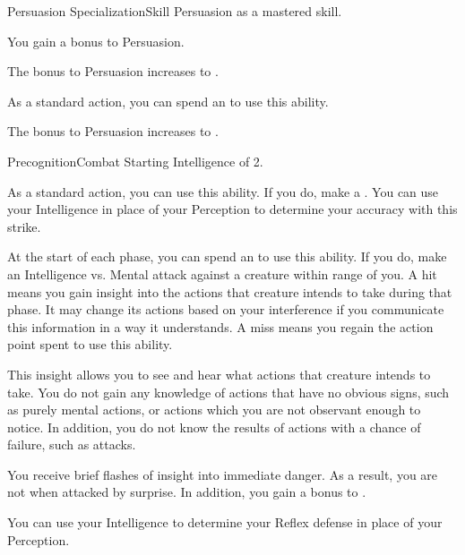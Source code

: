     \begin{feat}{Persuasion Specialization}{Skill}
        \featpre Persuasion as a mastered skill.
        \featben

         You gain a  bonus to Persuasion.

        \ff[2]{}

         The bonus to Persuasion increases to .

         As a standard action, you can spend an  to use this ability.

         The bonus to Persuasion increases to .
    \end{feat}

    \begin{feat}{Precognition}{Combat}
        \featpre Starting Intelligence of 2.
        \featben

         As a standard action, you can use this ability.
        If you do, make a .
        You can use your Intelligence in place of your Perception to determine your accuracy with this strike.

         At the start of each phase, you can spend an  to use this ability.
        If you do, make an Intelligence vs. Mental attack against a creature within \rngmed range of you.
        A hit means you gain insight into the actions that creature intends to take during that phase.
        It may change its actions based on your interference if you communicate this information in a way it understands.
        A miss means you regain the action point spent to use this ability.

        This insight allows you to see and hear what actions that creature intends to take.
        You do not gain any knowledge of actions that have no obvious signs, such as purely mental actions, or actions which you are not observant enough to notice.
        In addition, you do not know the results of actions with a chance of failure, such as attacks.

         You receive brief flashes of insight into immediate danger.
        As a result, you are not  when attacked by surprise.
        In addition, you gain a  bonus to .

         You can use your Intelligence to determine your Reflex defense in place of your Perception.


\end{feat}
